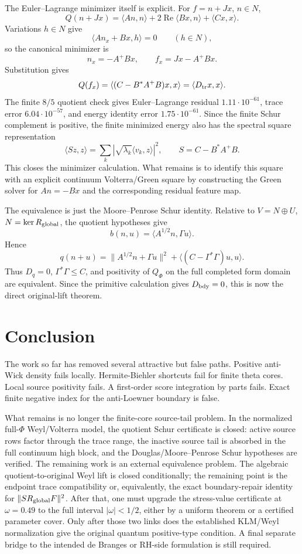 \documentclass[11pt]{article}
\begin{document}
The Euler--Lagrange minimizer itself is explicit.  For \(f=n+Jx\), \(n\in N\),
\[
  Q(n+Jx)=\langle An,n\rangle
  +2\operatorname{Re}\langle Bx,n\rangle
  +\langle Cx,x\rangle .
\]
Variations \(h\in N\) give
\[
  \langle An_x+Bx,h\rangle=0\qquad(h\in N),
\]
so the canonical minimizer is
\[
  n_x=-A^+Bx,\qquad f_x=Jx-A^+Bx .
\]
Substitution gives
\[
  Q(f_x)=\langle (C-B^\ast A^+B)x,x\rangle
  =
  \langle D_{\rm tr}x,x\rangle .
\]
The finite \(8/5\) quotient check gives Euler--Lagrange residual
\(1.11\cdot10^{-61}\), trace error \(6.04\cdot10^{-57}\), and energy identity
error \(1.75\cdot10^{-61}\).  Since the finite Schur complement is positive,
the finite minimized energy also has the spectral square representation
\[
  \langle Sz,z\rangle
  =
  \sum_k \left|\sqrt{\lambda_k}\langle v_k,z\rangle\right|^2,
  \qquad S=C-B^\ast A^+B .
\]
This closes the minimizer calculation.  What remains is to identify this square
with an explicit continuum Volterra/Green square by constructing the Green
solver for \(An=-Bx\) and the corresponding residual feature map.

The equivalence is just the Moore--Penrose Schur identity.  Relative to
\(V=N\oplus U\), \(N=\ker R_{\rm global}\), the quotient hypotheses give
\[
  b(n,u)=\langle A^{1/2}n,\Gamma u\rangle .
\]
Hence
\[
  q(n+u)
  =
  \|A^{1/2}n+\Gamma u\|^2+
  \langle (C-\Gamma^\ast\Gamma)u,u\rangle .
\]
Thus \(D_q=0\), \(\Gamma^\ast\Gamma\le C\), and positivity of \(Q_\Phi\) on the
full completed form domain are equivalent.  Since the primitive calculation gives
\(D_{\rm bdy}=0\), this is now the direct original-lift theorem.

\section{Conclusion}

The work so far has removed several attractive but false paths.  Positive
anti-Wick density fails locally.  Hermite-Biehler shortcuts fail for finite
theta cores.  Local source positivity fails.  A first-order score integration
by parts fails.  Exact finite negative index for the anti-Loewner boundary is
false.

What remains is no longer the finite-core source-tail problem.  In the
normalized full-\(\Phi\) Weyl/Volterra model, the quotient Schur certificate is
closed: active source rows factor through the trace range, the inactive source
tail is absorbed in the full continuum high block, and the
Douglas/Moore--Penrose Schur hypotheses are verified.  The remaining work is an
external equivalence problem.  The algebraic quotient-to-original Weyl lift is
closed conditionally; the remaining point is the endpoint trace compatibility
or, equivalently, the exact boundary-repair identity for
\(\|S R_{\rm global}F\|^2\).  After that, one must upgrade the stress-value
certificate at \(\omega=0.49\) to the full interval \(|\omega|<1/2\), either by
a uniform theorem or a certified parameter cover.  Only after those two links
does the established KLM/Weyl normalization give the original quantum
positive-type condition.  A final separate bridge to the intended de Branges or
RH-side formulation is still required.
\end{document}
